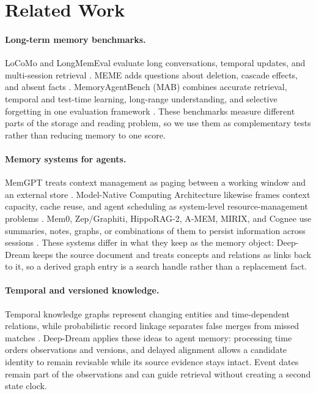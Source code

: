 \section{Related Work}
\label{sec:related-work}

\paragraph{Long-term memory benchmarks.}
LoCoMo and LongMemEval evaluate long conversations, temporal updates, and multi-session retrieval \citep{maharana2024locomo,wu2025longmemeval}. MEME adds questions about deletion, cascade effects, and absent facts \citep{jung2026meme}. MemoryAgentBench (MAB) combines accurate retrieval, temporal and test-time learning, long-range understanding, and selective forgetting in one evaluation framework \citep{hu2025memoryagentbench}. These benchmarks measure different parts of the storage and reading problem, so we use them as complementary tests rather than reducing memory to one score.

\paragraph{Memory systems for agents.}
MemGPT treats context management as paging between a working window and an external store \citep{packer2023memgpt}. Model-Native Computing Architecture likewise frames context capacity, cache reuse, and agent scheduling as system-level resource-management problems \citep{lin2026icam}. Mem0, Zep/Graphiti, HippoRAG-2, A-MEM, MIRIX, and Cognee use summaries, notes, graphs, or combinations of them to persist information across sessions \citep{chhikara2025mem0,rasmussen2025zep,gutierrez2025hipporag2,xu2025amem,wang2025mirix,markovic2025cognee}. These systems differ in what they keep as the memory object: Deep-Dream keeps the source document and treats concepts and relations as links back to it, so a derived graph entry is a search handle rather than a replacement fact.

\paragraph{Temporal and versioned knowledge.}
Temporal knowledge graphs represent changing entities and time-dependent relations, while probabilistic record linkage separates false merges from missed matches \citep{fellegi1969theory}. Deep-Dream applies these ideas to agent memory: processing time orders observations and versions, and delayed alignment allows a candidate identity to remain revisable while its source evidence stays intact. Event dates remain part of the observations and can guide retrieval without creating a second state clock.

